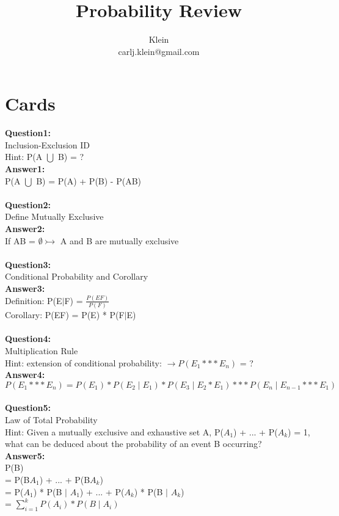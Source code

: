 \documentclass{article}
\begin{document}
	\title{Probability Review}
	\author{Klein \\ carlj.klein@gmail.com}
	\date{}
	\maketitle


\section{Cards}
\textbf{Question1:} \\
Inclusion-Exclusion ID
\\
Hint: P(A $\bigcup$ B) = ?
\\
\textbf{Answer1:} \\
P(A $\bigcup$ B) = P(A) + P(B) - P(AB)
\\\\


\textbf{Question2:} \\
Define Mutually Exclusive
\\
\textbf{Answer2:} \\
If AB = $\emptyset \rightarrowtail$ A and B are mutually exclusive 
\\\\

\textbf{Question3:} \\
Conditional Probability and Corollary
\\
\textbf{Answer3:} \\
Definition: P(E$\mid$F) = $\frac{P(EF)}{P(F)}$ 
\\
Corollary: P(EF) = P(E) * P(F$\mid$E)
\\\\


\textbf{Question4:} \\
Multiplication Rule
\\
Hint: extension of conditional probability: $\rightarrow P(E_1 *** E_n)$ = ?
\\
\textbf{Answer4:} \\
$P(E_1 *** E_n) = P(E_1) * P(E_2\mid E_1) * P(E_3\mid E_2 * E_1) *** P(E_n\mid E_{n-1} *** E_1)$
\\\\


\textbf{Question5:} \\
Law of Total Probability
\\
Hint: Given a mutually exclusive and exhaustive set A, P($A_1$) + ... + P($A_k$) = 1, what can be deduced about the probability of an event B occurring?
\\
\textbf{Answer5:} \\
P(B)\\
= P(B$A_1$) + ... + P(B$A_k$)\\
= P($A_1$) * P(B $\mid$ $A_1$) + ... + P($A_k$) * P(B $\mid$ $A_k$)\\
= $\sum_{i=1}^k P(A_i) * P(B \mid A_i)$
\\\\
\end{document}

